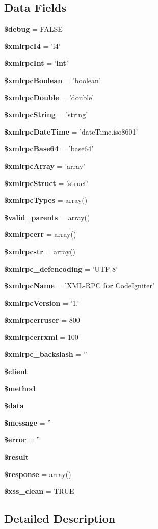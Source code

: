 \subsection*{Data Fields}
\begin{DoxyCompactItemize}
\item 
{\bf \$debug} = F\-A\-L\-S\-E
\item 
{\bf \$xmlrpc\-I4} = 'i4'
\item 
{\bf \$xmlrpc\-Int} = '{\bf int}'
\item 
{\bf \$xmlrpc\-Boolean} = 'boolean'
\item 
{\bf \$xmlrpc\-Double} = 'double'
\item 
{\bf \$xmlrpc\-String} = 'string'
\item 
{\bf \$xmlrpc\-Date\-Time} = 'date\-Time.\-iso8601'
\item 
{\bf \$xmlrpc\-Base64} = 'base64'
\item 
{\bf \$xmlrpc\-Array} = 'array'
\item 
{\bf \$xmlrpc\-Struct} = 'struct'
\item 
{\bf \$xmlrpc\-Types} = array()
\item 
{\bf \$valid\-\_\-parents} = array()
\item 
{\bf \$xmlrpcerr} = array()
\item 
{\bf \$xmlrpcstr} = array()
\item 
{\bf \$xmlrpc\-\_\-defencoding} = 'U\-T\-F-\/8'
\item 
{\bf \$xmlrpc\-Name} = 'X\-M\-L-\/R\-P\-C {\bf for} Code\-Igniter'
\item 
{\bf \$xmlrpc\-Version} = '1.'
\item 
{\bf \$xmlrpcerruser} = 800
\item 
{\bf \$xmlrpcerrxml} = 100
\item 
{\bf \$xmlrpc\-\_\-backslash} = ''
\item 
{\bf \$client}
\item 
{\bf \$method}
\item 
{\bf \$data}
\item 
{\bf \$message} = ''
\item 
{\bf \$error} = ''
\item 
{\bf \$result}
\item 
{\bf \$response} = array()
\item 
{\bf \$xss\-\_\-clean} = T\-R\-U\-E
\end{DoxyCompactItemize}


\subsection{Detailed Description}


